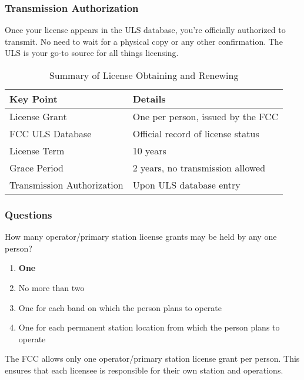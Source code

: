 \subsubsection*{Transmission Authorization}
Once your license appears in the ULS database, you're officially authorized to transmit. No need to wait for a physical copy or any other confirmation. The ULS is your go-to source for all things licensing.


\begin{table}[h]
    \centering
    \begin{tabular}{|l|l|}
        \hline
        \textbf{Key Point} & \textbf{Details} \\ \hline
        License Grant & One per person, issued by the FCC \\ \hline
        FCC ULS Database & Official record of license status \\ \hline
        License Term & 10 years \\ \hline
        Grace Period & 2 years, no transmission allowed \\ \hline
        Transmission Authorization & Upon ULS database entry \\ \hline
    \end{tabular}
    \caption{Summary of License Obtaining and Renewing}
    \label{tab:license-summary}
\end{table}

\subsubsection{Questions}

\begin{tcolorbox}[colback=gray!10!white,colframe=black!75!black,title={T1A04}]
    How many operator/primary station license grants may be held by any one person?
    \begin{enumerate}[label=\Alph*),noitemsep]
        \item \textbf{One}
        \item No more than two
        \item One for each band on which the person plans to operate
        \item One for each permanent station location from which the person plans to operate
    \end{enumerate}
\end{tcolorbox}
The FCC allows only one operator/primary station license grant per person. This ensures that each licensee is responsible for their own station and operations.

